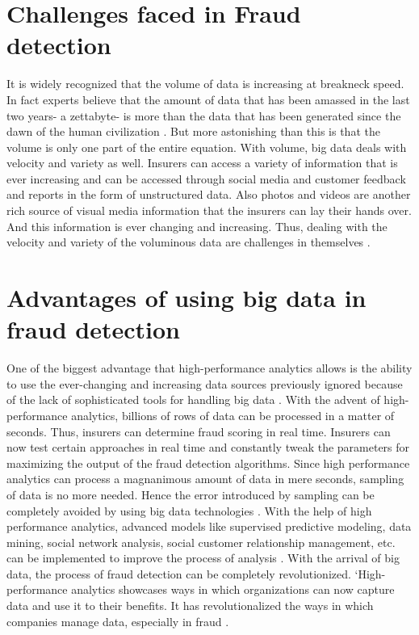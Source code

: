\documentclass[sigconf]{acmart}
\begin{document}
\section{Challenges faced in Fraud detection}
It is widely recognized that the volume of data is increasing at breakneck speed. In fact experts believe that the amount of data that has been amassed in the last two years- a zettabyte- is more than the data that has been generated since the dawn of the human civilization \cite{link2}. But more astonishing than this is that the volume is only one part of the entire equation. With volume, big data deals with velocity and variety as well. Insurers can access a variety of information that is ever increasing and can be accessed through social media and customer feedback and reports in the form of unstructured data. Also photos and videos are another rich source of visual media information that the insurers can lay their hands over. And this information is ever changing and increasing. Thus, dealing with the velocity and variety of the voluminous data are challenges in themselves \cite{link3}.

\section{Advantages of using big data in fraud detection}
One of the biggest advantage that high-performance analytics allows is the ability to use the ever-changing and increasing data sources previously ignored because of the lack of sophisticated tools for handling big data \cite{link3}. With the advent of high-performance analytics, billions of rows of data can be processed in a matter of seconds. Thus, insurers can determine fraud scoring in real time. Insurers can now test certain approaches in real time and constantly tweak the parameters for maximizing the output of the fraud detection algorithms. Since high performance analytics can process a magnanimous amount of data in mere seconds, sampling of data is no more needed. Hence the error introduced by sampling can be completely avoided by using big data technologies \cite{link3}. With the help of high performance analytics, advanced models like supervised predictive modeling, data mining, social network analysis, social customer relationship management, etc. can be implemented to improve the process of analysis \cite{link7}. With the arrival of big data, the process of fraud detection can be completely revolutionized. `High-performance analytics showcases ways in which organizations can now capture data and use it to their benefits. It has revolutionalized the ways in which companies manage data, especially in fraud \cite{link3}.
\end{document}
